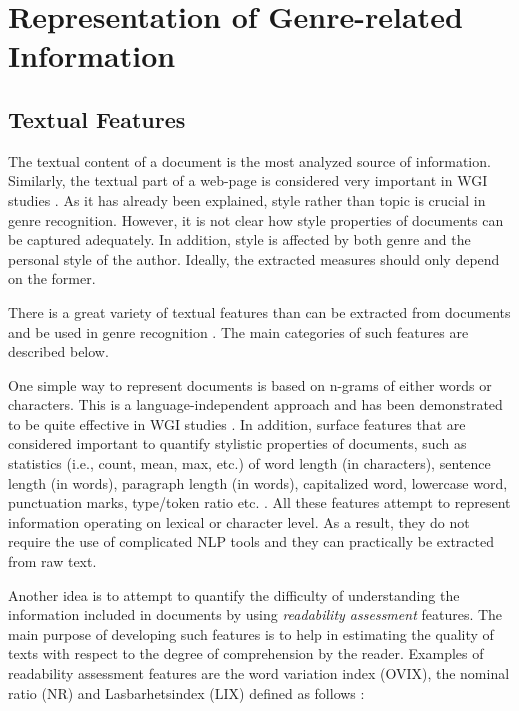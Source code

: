 \section{Representation of Genre-related Information}

\subsection{Textual Features}

The textual content of a document is the most analyzed source of information. Similarly, the textual part of a web-page is considered very important in WGI studies \parencite{mason2009distance,Sharroff2010}. As it has already been explained, style rather than topic is crucial in genre recognition. However, it is not clear how style properties of documents can be captured adequately. In addition, style is affected by both genre and the personal style of the author. Ideally, the extracted measures should only depend on the former. 

There is a great variety of textual features than can be extracted from documents and be used in genre recognition \parencite{kanaris2009learning,kumari2014web,levering2008using,Lim2005,mason2009n,onan2018ensemble,petrenz2011stable,sharoff2010web,Nooralahzadeh2014}. The main categories of such features are described below.

One simple way to represent documents is based on n-grams of either words or characters. This is a language-independent approach and has been demonstrated to be quite effective in WGI studies \parencite{kanaris2009learning,sharoff2010web,kumari2014web}. In addition, surface features that are considered important to quantify stylistic properties of documents, such as statistics (i.e., count, mean, max, etc.) of word length (in characters), sentence length (in words), paragraph length (in words), capitalized word, lowercase word, punctuation marks, type/token ratio etc. \parencite{feldman2009classifying,santini2005linguistic,onan2018ensemble}. All these features attempt to represent information operating on lexical or character level. As a result, they do not require the use of complicated NLP tools and they can practically be extracted from raw text. 

Another idea is to attempt to quantify the difficulty of understanding the information included in documents by using \textit{readability assessment} features. The main purpose of developing such features is to help in estimating the quality of texts with respect to the degree of comprehension by the reader. Examples of readability assessment features are the word variation index (OVIX), the nominal ratio (NR) and Lasbarhetsindex (LIX) defined as follows \parencite{falkenjack2013features}:

